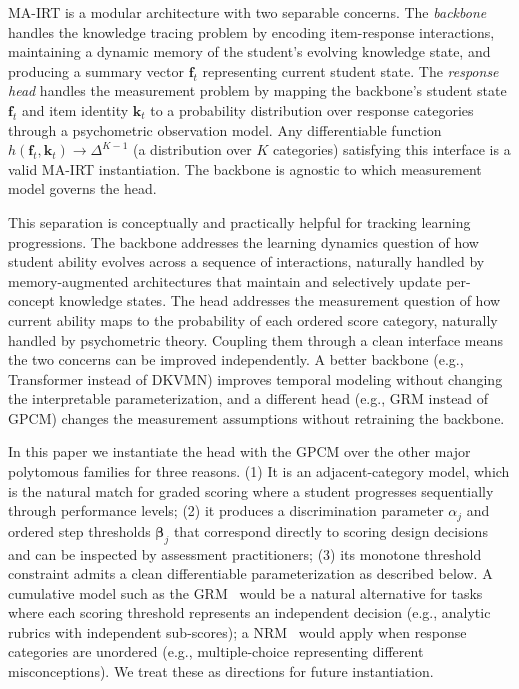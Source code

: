 \documentclass[pdflatex,sn-apa]{sn-jnl}
\begin{document}
MA-IRT is a modular architecture with two separable concerns. The \emph{backbone} handles the knowledge tracing problem by encoding item-response interactions, maintaining a dynamic memory of the student's evolving knowledge state, and producing a summary vector $\mathbf{f}_t$ representing current student state. The \emph{response head} handles the measurement problem by mapping the backbone's student state $\mathbf{f}_t$ and item identity $\mathbf{k}_t$ to a probability distribution over response categories through a psychometric observation model. Any differentiable function $h(\mathbf{f}_t, \mathbf{k}_t) \to \Delta^{K-1}$ (a distribution over $K$ categories) satisfying this interface is a valid MA-IRT instantiation. The backbone is agnostic to which measurement model governs the head.

This separation is conceptually and practically helpful for tracking learning progressions. The backbone addresses the learning dynamics question of how student ability evolves across a sequence of interactions, naturally handled by memory-augmented architectures that maintain and selectively update per-concept knowledge states. The head addresses the measurement question of how current ability maps to the probability of each ordered score category, naturally handled by psychometric theory. Coupling them through a clean interface means the two concerns can be improved independently. A better backbone (e.g., Transformer instead of DKVMN) improves temporal modeling without changing the interpretable parameterization, and a different head (e.g., GRM instead of GPCM) changes the measurement assumptions without retraining the backbone.

In this paper we instantiate the head with the GPCM over the other major polytomous families for three reasons. (1) It is an adjacent-category model, which is the natural match for graded scoring where a student progresses sequentially through performance levels; (2) it produces a discrimination parameter $\alpha_j$ and ordered step thresholds $\boldsymbol{\beta}_j$ that correspond directly to scoring design decisions and can be inspected by assessment practitioners; (3) its monotone threshold constraint admits a clean differentiable parameterization as described below. A cumulative model such as the GRM~\citep{samejima_estimation_1969} would be a natural alternative for tasks where each scoring threshold represents an independent decision (e.g., analytic rubrics with independent sub-scores); a NRM~\citep{bock_estimating_1972} would apply when response categories are unordered (e.g., multiple-choice representing different misconceptions). We treat these as directions for future instantiation.
\end{document}
